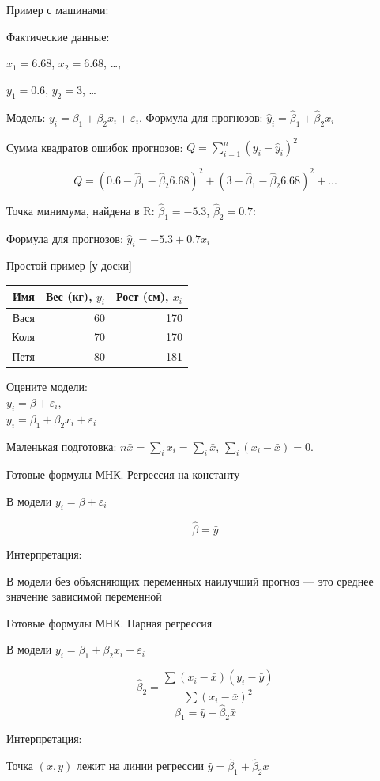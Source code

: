\documentclass[russian,ignorenonframetext,]{beamer}
\begin{document}
\begin{frame}{Пример с машинами:}

Фактические данные:

\(x_1=6.68\), \(x_2=6.68\), \ldots{},

\(y_1=0.6\), \(y_2=3\), \ldots{}

Модель: \(y_i=\beta_1+\beta_2 x_i+\varepsilon_i\). Формула для
прогнозов: \(\hat{y}_i=\hat{\beta}_1 + \hat{\beta}_2 x_i\)

Сумма квадратов ошибок прогнозов: \(Q=\sum_{i=1}^n (y_i-\hat{y}_i)^2\)

\[
Q=(0.6-\hat{\beta}_1-\hat{\beta}_2 6.68)^2+(3-\hat{\beta}_1-\hat{\beta}_2 6.68)^2+...
\]

Точка минимума, найдена в R: \(\hat{\beta}_1=-5.3\),
\(\hat{\beta}_2=0.7\):

Формула для прогнозов: \(\hat{y}_i=-5.3 + 0.7 x_i\)

\end{frame}

\begin{frame}{Простой пример {[}у доски{]}}

\begin{longtable}[c]{@{}rrr@{}}
\toprule
Имя & Вес (кг), \(y_i\) & Рост (см), \(x_i\)\tabularnewline
\midrule
\endhead
Вася & 60 & 170\tabularnewline
Коля & 70 & 170\tabularnewline
Петя & 80 & 181\tabularnewline
\bottomrule
\end{longtable}

Оцените модели:\\
\(y_i=\beta +\varepsilon_i\),\\
\(y_i=\beta_1+\beta_2 x_i +\varepsilon_i\)

Маленькая подготовка: \(n\bar{x}=\sum_i x_i=\sum_i \bar{x}\),
\(\sum_i (x_i - \bar{x})=0\).

\end{frame}

\begin{frame}{Готовые формулы МНК. Регрессия на константу}

В модели \(y_i=\beta +\varepsilon_i\)

\[
\hat{\beta}=\bar{y}
\]

Интерпретация:

В модели без объясняющих переменных наилучший прогноз --- это среднее
значение зависимой переменной

\end{frame}

\begin{frame}{Готовые формулы МНК. Парная регрессия}

В модели \(y_i=\beta_1+\beta_2 x_i +\varepsilon_i\)

\[
\hat{\beta}_2=\frac{\sum (x_i-\bar{x})(y_i-\bar{y})}{\sum (x_i-\bar{x})^2}
\] \[
\hat{\beta}_1=\bar{y}-\hat{\beta}_2\bar{x}
\]

Интерпретация:

Точка \((\bar{x},\bar{y})\) лежит на линии регрессии
\(\hat{y}=\hat{\beta}_1+\hat{\beta}_2 x\)

\end{frame}
\end{document}
